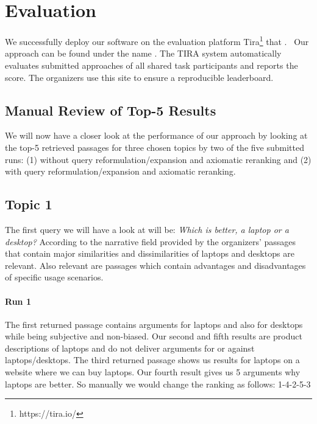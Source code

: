 \section{Evaluation}
\label{evaluation}

We successfully deploy our software on the evaluation platform Tira\footnote{https://tira.io/} that .~\todocite
Our approach can be found under the name .
The TIRA system automatically evaluates submitted approaches of all shared task participants and reports the  score.
The organizers use this site to ensure a reproducible leaderboard.

\subsection{Manual Review of Top-5 Results}

We will now have a closer look at the performance of our approach by looking at the top-5 retrieved passages for three chosen topics by two of the five submitted runs: 
(1) without query reformulation/expansion and axiomatic reranking and
(2) with query reformulation/expansion and axiomatic reranking.

\subsection{Topic 1}

The first query we will have a look at will be: \textit{Which is better, a laptop or a desktop?}
According to the narrative field provided by the organizers' passages that contain major similarities and dissimilarities of laptops and desktops are relevant.
Also relevant are passages which contain advantages and disadvantages of specific usage scenarios.

\paragraph{Run 1}

The first returned passage contains arguments for laptops and also for desktops while being subjective and non-biased.
Our second and fifth results are product descriptions of laptops and do not deliver arguments for or against laptops/desktops.
The third returned passage shows us results for laptops on a website where we can buy laptops.
Our fourth result gives us 5 arguments why laptops are better.
So manually we would  change the ranking as follows: 1-4-2-5-3

